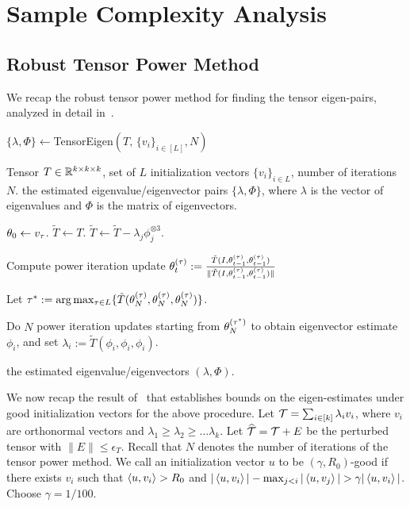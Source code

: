 \section{Sample Complexity Analysis}

\subsection{Robust Tensor Power Method}
We recap the robust tensor power method for finding the tensor eigen-pairs, analyzed in detail in~\cite{AnandkumarEtal:community12}.

\begin{algorithm}
\caption{$\{\lambda, \Phi\}\leftarrow $TensorEigen$(T,\, \{v_i\}_{i\in [L]}, N)$}\label{alg:robustpower}
\begin{algorithmic}
\renewcommand{\algorithmicrequire}{\textbf{Input: }}
\renewcommand{\algorithmicensure}{\textbf{Output: }}
\REQUIRE Tensor $T\in \mathbb{R}^{k \times k \times k}$, set of $L$ initialization vectors $\{v_i\}_{i\in L}$, number of
iterations  $N$.
\ENSURE the estimated eigenvalue/eigenvector pairs $\{\lambda, \Phi\}$, where $\lambda$ is the vector of eigenvalues and $\Phi$ is the matrix of eigenvectors.

\STATE $\theta_{0}\leftarrow v_\tau$.
\STATE $\tilde{T}\leftarrow T$.
\STATE $\tilde{T}\leftarrow \tilde{T}- \lambda_j \phi_j^{\otimes 3}$.
\ENDIF
\ENDFOR

\STATE Compute power iteration update
$
\theta_{t}^{(\tau)}  :=
\frac{\tilde{T}(I, \theta_{t-1}^{(\tau)}, \theta_{t-1}^{(\tau)})}
{\|\tilde{T}(I, \theta_{t-1}^{(\tau)}, \theta_{t-1}^{(\tau)})\|}
$\ENDFOR
\ENDFOR

\STATE Let $\tau^* := \arg\max_{\tau \in L} \{ \tilde{T}(\theta_{N}^{(\tau)},
\theta_{N}^{(\tau)}, \theta_{N}^{(\tau)}) \}$.

\STATE Do $N$ power iteration updates starting from
$\theta_{N}^{(\tau^*)}$ to obtain eigenvector estimate $\phi_i$, and set $\lambda_i :=
\tilde{T}(\phi_i, \phi_i, \phi_i)$.

\ENDFOR
\RETURN the estimated eigenvalue/eigenvectors
$(\lambda, \Phi)$.

\end{algorithmic}
\end{algorithm}


We now recap the result of~\cite[Thm. 13]{AnandkumarEtal:community12} that establishes bounds on the eigen-estimates under good initialization vectors for the above procedure. 
Let ${\mathcal{T}}=\sum_{i\in [k]}\lambda_i v_i$, where $v_i$ are orthonormal vectors and $\lambda_1\geq \lambda_2\geq\ldots \lambda_k$. Let $\widehat{{\mathcal{T}}}={\mathcal{T}}+E$ be the perturbed tensor with $\|E\|\leq \epsilon_{T}$. Recall that $N$ denotes the number of iterations of the tensor power method.
We call an initialization vector $u$ to be $(\gamma, R_0)$-good  if there exists $v_i$ such that $\left<u, v_i\right>> R_0$
  and $|\left<u, v_i\right>| -\max_{j<i} |\left<u,v_j\right>| > \gamma  |\left<u,v_i\right>|$.   Choose $\gamma=1/100$.


